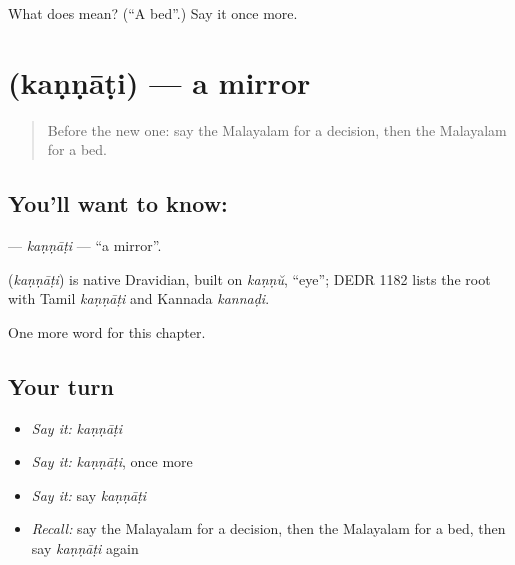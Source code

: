 \begin{tcolorbox}[breakable,colback=teal!4,colframe=teal!35!black,title={Before you move on}]
What does  mean? (\textquotedblleft{}A bed\textquotedblright{}.) Say it once more.
\end{tcolorbox}
\section[\texorpdfstring{\ml{കണ്ണാടി} (kaṇṇāṭi)}{കണ്ണാടി (kaṇṇāṭi)}]{ (kaṇṇāṭi) — a mirror}

\label{lesson:ML-C146-kannati}



\begin{quote}
Before the new one: say the Malayalam for a decision, then the Malayalam for a bed.
\end{quote}

\subsection*{You'll want to know: }
\textbf{} — \emph{kaṇṇāṭi} — \textquotedblleft{}a mirror\textquotedblright{}.

\begin{cousinweb}
\textbf{} (\emph{kaṇṇāṭi}) is native Dravidian, built on \emph{kaṇṇŭ}, \textquotedblleft{}eye\textquotedblright{}; DEDR 1182 lists the root with Tamil \emph{kaṇṇāṭi} and Kannada \emph{kannaḍi}.
\end{cousinweb}

\begin{grammarlens}[title={What you've built}]
One more word for this chapter.
\end{grammarlens}

\subsection*{Your turn}
\begin{itemize}
\raggedright
  \item \emph{Say it:} \emph{kaṇṇāṭi}
  \item \emph{Say it:} \emph{kaṇṇāṭi}, once more
  \item \emph{Say it:} say \emph{kaṇṇāṭi}
  \item \emph{Recall:} say the Malayalam for a decision, then the Malayalam for a bed, then say \emph{kaṇṇāṭi} again
\end{itemize}


